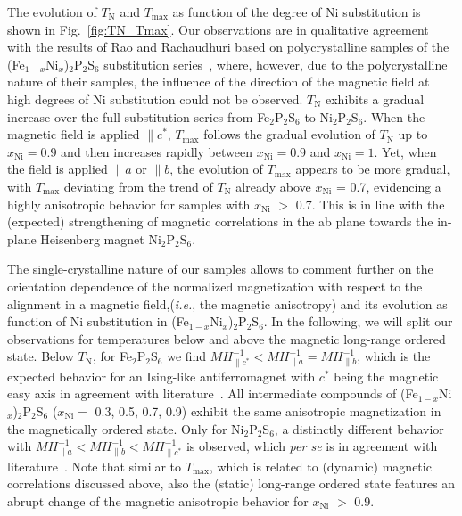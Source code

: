 \documentclass[twocolumn,superscriptaddress,prb,preprintnumbers,nobibnotes,aps]{revtex4-2}  %
\begin{document}
The evolution of $T_\textrm{N}$ and $T_\textrm{max}$ as function of the degree of Ni substitution is shown in Fig.~\ref{fig:TN_Tmax}. Our observations are in qualitative agreement with the results of Rao and Rachaudhuri based on polycrystalline samples of the (Fe$_{1-x}$Ni$_x$)$_2$P$_2$S$_6$ substitution series~\cite{RRao1992}, where, however, due to the polycrystalline nature of their samples, the influence of the direction of the magnetic field at high degrees of Ni substitution could not be observed. $T_\textrm{N}$ exhibits a gradual increase over the full substitution series from Fe$_2$P$_2$S$_6$ to Ni$_2$P$_2$S$_6$. When the magnetic field is applied $\parallel c^*$, $T_\textrm{max}$ follows the gradual evolution of $T_\textrm{N}$ up to $x_\textrm{Ni} = 0.9$ and then increases rapidly between $x_\textrm{Ni} = 0.9$ and $x_\textrm{Ni} = 1$. Yet, when the field is applied $\parallel a$ or $\parallel b$, the evolution of $T_\textrm{max}$ appears to be more gradual, with $T_{\textrm{max}}$ deviating from the trend of $T_\textrm{N}$ already above $x_{\textrm{Ni}}$ = 0.7, evidencing a highly anisotropic behavior for samples with $x_\textrm{Ni}$ $>$ 0.7. This is in line with the (expected) strengthening of magnetic correlations in the ab plane towards the in-plane Heisenberg magnet Ni$_2$P$_2$S$_6$.

The single-crystalline nature of our samples allows to comment further on the orientation dependence of the normalized magnetization with respect to the alignment in a magnetic field,(\textit{i.e.}, the magnetic anisotropy) and its evolution as function of Ni substitution in (Fe$_{1-x}$Ni$_x$)$_2$P$_2$S$_6$. In the following, we will split our observations for temperatures below and above the magnetic long-range ordered state. Below $T_\textrm{N}$, for Fe$_2$P$_2$S$_6$ we find $MH^{-1}_{\parallel c^*} < MH^{-1}_{\parallel a} = MH^{-1}_{\parallel b}$, which is the expected behavior for an Ising-like antiferromagnet with $c^*$ being the magnetic easy axis in agreement with literature~\cite{PJoy1992,DLancon2016}. All intermediate compounds of (Fe$_{1-x}$Ni$_x$)$_2$P$_2$S$_6$ ($x_\textrm{Ni} =$ 0.3, 0.5, 0.7, 0.9) exhibit the same anisotropic magnetization in the magnetically ordered state. Only for Ni$_2$P$_2$S$_6$, a distinctly different behavior with $MH^{-1}_{\parallel a} < MH^{-1}_{\parallel b} < MH^{-1}_{\parallel c^*}$ is observed, which \textit{per se} is in agreement with literature~\cite{PJoy1992,AWildes2015}. Note that similar to $T_\textrm{max}$, which is related to (dynamic) magnetic correlations discussed above, also the (static) long-range ordered state features an abrupt change of the magnetic anisotropic behavior for $x_\textrm{Ni}$ $>$ 0.9.
\end{document}
